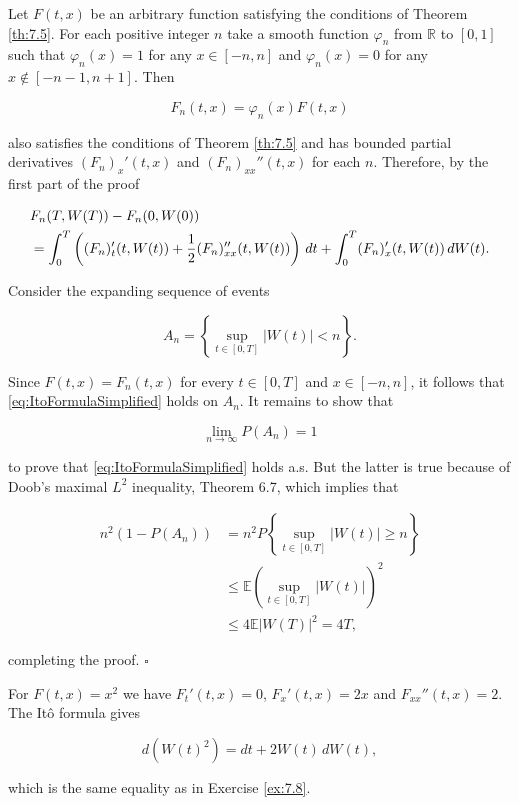 \begin{Proof}
Let $F(t, x)$ be an arbitrary function satisfying the conditions of Theorem \ref{th:7.5}. For each positive integer $n$ take a smooth function $\varphi_n$ from $\mathbb{R}$ to $[0, 1]$ such that $\varphi_n(x) = 1$ for any $x \in [-n, n]$ and $\varphi_n(x) = 0$ for any $x \notin [-n-1, n+1]$. Then

\begin{equation}
F_n(t, x) = \varphi_n(x) F(t, x)
\end{equation}

also satisfies the conditions of Theorem \ref{th:7.5} and has bounded partial derivatives $(F_n)_x'(t, x)$ and $(F_n)_{xx}''(t, x)$ for each $n$. Therefore, by the first part of the proof

\begin{align}
& F_n(T, W(T)) - F_n(0, W(0)) \label{eq:Fn_Ito_formula} \\
& = \int_0^T \left((F_n)_t'(t, W(t)) + \frac{1}{2} (F_n)_{xx}''(t, W(t))\right) \, dt + \int_0^T (F_n)_x'(t, W(t)) \, dW(t). \notag
\end{align}

Consider the expanding sequence of events

\begin{equation}
A_n = \left\{\sup_{t \in [0, T]} |W(t)| < n\right\}.
\end{equation}

Since $F(t, x) = F_n(t, x)$ for every $t \in [0, T]$ and $x \in [-n, n]$, it follows that \eqref{eq:ItoFormulaSimplified} holds on $A_n$. It remains to show that

\begin{equation}
\lim_{n \to \infty} P(A_n) = 1
\end{equation}

to prove that \eqref{eq:ItoFormulaSimplified} holds a.s. But the latter is true because of Doob's maximal $L^2$ inequality, Theorem 6.7, which implies that

\begin{align}
n^2 (1 - P(A_n)) & = n^2 P\left\{\sup_{t \in [0, T]} |W(t)| \geq n\right\} \\
& \leq \mathbb{E}\left(\sup_{t \in [0, T]} |W(t)|\right)^2 \\
& \leq 4 \mathbb{E}|W(T)|^2 = 4T,
\end{align}

completing the proof. \hfill $\square$
\end{Proof}

\begin{Example}
\label{ex:7-ito-formula-example}
For $F(t, x) = x^2$ we have $F_t'(t, x) = 0$, $F_x'(t, x) = 2x$ and $F_{xx}''(t, x) = 2$. The Itô formula gives

\begin{equation}
d\left(W(t)^2\right) = dt + 2W(t) \, dW(t),
\end{equation}

which is the same equality as in Exercise \ref{ex:7.8}.
\end{Example}

